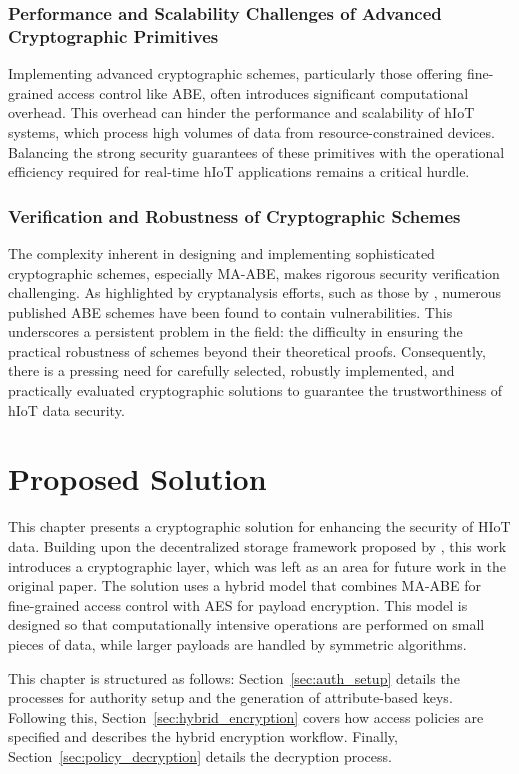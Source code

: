 \documentclass[cic,tc,english]{iiufrgs}
\numberwithin{algorithm}{chapter}
\begin{document}
        \subsection{Performance and Scalability Challenges of Advanced Cryptographic Primitives}
            Implementing advanced cryptographic schemes, particularly those offering fine-grained access control like ABE, often introduces significant computational overhead. This overhead can hinder the performance and scalability of hIoT systems, which process high volumes of data from resource-constrained devices. Balancing the strong security guarantees of these primitives with the operational efficiency required for real-time hIoT applications remains a critical hurdle.

        \subsection{Verification and Robustness of Cryptographic Schemes}
            The complexity inherent in designing and implementing sophisticated cryptographic schemes, especially MA-ABE, makes rigorous security verification challenging. As highlighted by cryptanalysis efforts, such as those by \citet{broken2020}, numerous published ABE schemes have been found to contain vulnerabilities. This underscores a persistent problem in the field: the difficulty in ensuring the practical robustness of schemes beyond their theoretical proofs. Consequently, there is a pressing need for carefully selected, robustly implemented, and practically evaluated cryptographic solutions to guarantee the trustworthiness of hIoT data security.

\chapter{Proposed Solution}
    \label{chap:proposedsolution}

    This chapter presents a cryptographic solution for enhancing the security of HIoT data. Building upon the decentralized storage framework proposed by \citet{laura2023}, this work introduces a cryptographic layer, which was left as an area for future work in the original paper. The solution uses a hybrid model that combines MA-ABE for fine-grained access control with AES for payload encryption. This model is designed so that computationally intensive operations are performed on small pieces of data, while larger payloads are handled by symmetric algorithms.

    This chapter is structured as follows: Section~\ref{sec:auth_setup} details the processes for authority setup and the generation of attribute-based keys. Following this, Section~\ref{sec:hybrid_encryption} covers how access policies are specified and describes the hybrid encryption workflow. Finally, Section~\ref{sec:policy_decryption} details the decryption process.
\end{document}
